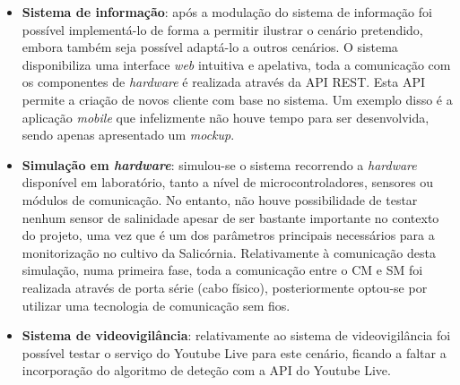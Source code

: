 \begin{itemize}
	
	\item \textbf{Sistema de informação}: após a modulação do sistema de informação foi possível implementá-lo de forma a permitir ilustrar o cenário pretendido, embora também seja possível adaptá-lo a outros cenários. O sistema disponibiliza uma interface \textit{web} intuitiva e apelativa, toda a comunicação com os componentes de \textit{hardware} é realizada através da \ac{API} \ac{REST}. Esta \ac{API} permite a criação de novos cliente com base no sistema. Um exemplo disso é a aplicação \textit{mobile} que infelizmente não houve tempo para ser desenvolvida, sendo apenas apresentado um \textit{mockup}. 
	
	  
	
	\item \textbf{Simulação em \textit{hardware}}: simulou-se o sistema recorrendo a \textit{hardware} disponível em laboratório, tanto a nível de microcontroladores, sensores ou módulos de comunicação. No entanto, não houve possibilidade de testar nenhum sensor de salinidade apesar de ser bastante importante no contexto do projeto, uma vez que é um dos parâmetros principais necessários para a monitorização no cultivo da Salicórnia. Relativamente à comunicação desta simulação, numa primeira fase, toda a comunicação entre o \acl{CM} e \acl{SM} foi realizada através de porta série (cabo físico), posteriormente optou-se por utilizar uma tecnologia de comunicação sem fios. 
	 
	\item \textbf{Sistema de videovigilância}: relativamente ao sistema de videovigilância foi possível testar o serviço do Youtube Live para este cenário, ficando a faltar a incorporação do algoritmo de deteção com a API do Youtube Live. 
	

	
\end{itemize}





